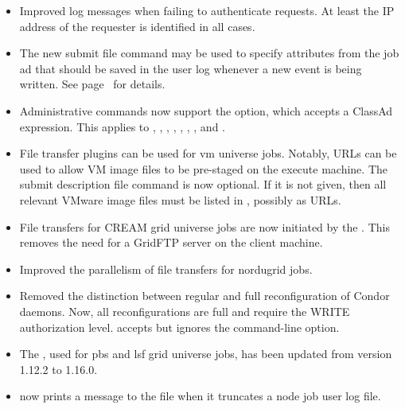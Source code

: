 \begin{itemize}
\item Improved log messages when failing to authenticate requests.  At
  least the IP address of the requester is identified in all cases.

\item The new submit file command 
may be used to specify attributes from the job ad that should be saved
in the user log whenever a new event is being written.  See
page~\pageref{man-condor-submit-job-ad-information-attrs} for details.

\item Administrative commands now support the  option, which
  accepts a ClassAd expression.  This applies to ,
  , , , ,
  , , and .

\item File transfer plugins can be used for vm universe jobs. Notably,
   URLs can be used to allow VM image files to be pre-staged
  on the execute machine. The submit description file command 
   is now optional.
  If it is not given, then all relevant VMware image files
  must be listed in , possibly as URLs.

\item File transfers for CREAM grid universe jobs are now initiated by
  the . This removes the need for a GridFTP server
  on the client machine.

\item Improved the parallelism of file transfers for nordugrid jobs.

\item Removed the distinction between regular and full reconfiguration
  of Condor daemons. Now, all reconfigurations are full and require the
  WRITE authorization level.  accepts but ignores the
   command-line option.

\item The , used for pbs and lsf grid universe jobs, has been
updated from version 1.12.2 to 1.16.0.

\item {} now prints a message to the  file
when it truncates a node job user log file.


\end{itemize}
